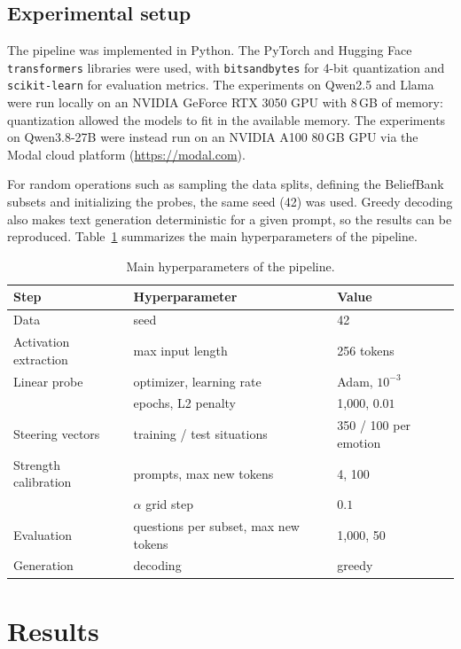 \documentclass{article}
\begin{document}
\subsection{Experimental setup}
\label{sec:methods_setup}
The pipeline was implemented in Python. The PyTorch and Hugging Face \texttt{transformers} libraries were used, with \texttt{bitsandbytes} for 4-bit quantization and \texttt{scikit-learn} for evaluation metrics. The experiments on Qwen2.5 and Llama were run locally on an NVIDIA GeForce RTX 3050 GPU with 8\,GB of memory: quantization allowed the models to fit in the available memory. The experiments on Qwen3.8-27B were instead run on an NVIDIA A100 80\,GB GPU via the Modal cloud platform (\url{https://modal.com}).

For random operations such as sampling the data splits, defining the BeliefBank subsets and initializing the probes, the same seed (42) was used. Greedy decoding also makes text generation deterministic for a given prompt, so the results can be reproduced. Table~\ref{tab:hyper_pipeline} summarizes the main hyperparameters of the pipeline.

\begin{table}[h]
  \centering
  \begin{tabular}{lll}
    \toprule
    Step & Hyperparameter & Value \\
    \midrule
    Data & seed & 42 \\
    Activation extraction & max input length & 256 tokens \\
    Linear probe & optimizer, learning rate & Adam, $10^{-3}$ \\
                 & epochs, L2 penalty & 1{,}000, $0.01$ \\
    Steering vectors & training / test situations & 350 / 100 per emotion \\
    Strength calibration & prompts, max new tokens & 4, 100 \\
                         & $\alpha$ grid step & $0.1$ \\
    Evaluation & questions per subset, max new tokens & 1{,}000, 50 \\
    Generation & decoding & greedy \\
    \bottomrule
  \end{tabular}
  \caption{Main hyperparameters of the pipeline.}
  \label{tab:hyper_pipeline}
\end{table}

\section{Results}
\label{sec:results}
\end{document}

